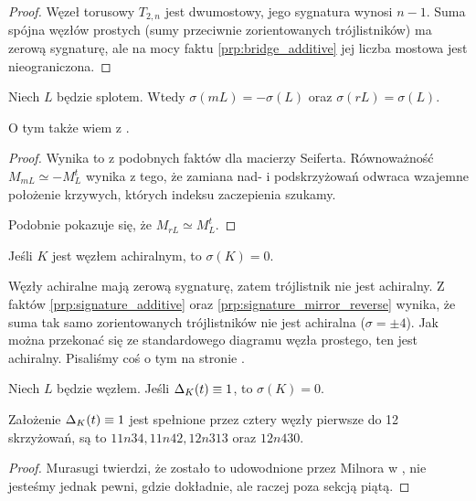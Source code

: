 \begin{proof}
    Węzeł torusowy $T_{2,n}$ jest dwumostowy, jego sygnatura wynosi $n - 1$.
    Suma spójna węzłów prostych (sumy przeciwnie zorientowanych trójlistników) ma zerową sygnaturę, ale na mocy faktu \ref{prp:bridge_additive} jej liczba mostowa jest nieograniczona.
\end{proof}

\begin{proposition}
%
%
\label{prp:signature_mirror_reverse}%
    Niech $L$ będzie splotem.
    Wtedy $\sigma(mL) = -\sigma(L)$ oraz $\sigma(rL) = \sigma(L)$.
\end{proposition}

O tym także wiem z \cite[s. 127]{murasugi96}.

\begin{proof}
    Wynika to z podobnych faktów dla macierzy Seiferta.
    Równoważność $M_{mL} \simeq - M_L^t$ wynika z tego, że zamiana nad- i podskrzyżowań odwraca wzajemne położenie krzywych, których indeksu zaczepienia szukamy.

    Podobnie pokazuje się, że $M_{rL} \simeq M_L^t$.
\end{proof}

\begin{corollary}
%
\label{cor:acheiral_signature}%
    Jeśli $K$ jest węzłem achiralnym, to $\sigma(K) = 0$.
\end{corollary}

Węzły achiralne mają zerową sygnaturę, zatem trójlistnik nie jest achiralny.
Z faktów \ref{prp:signature_additive} oraz \ref{prp:signature_mirror_reverse} wynika, że suma tak samo zorientowanych trójlistników nie jest achiralna ($\sigma = \pm 4$).
Jak można przekonać się ze standardowego diagramu węzła prostego, ten jest achiralny.
Pisaliśmy coś o tym na stronie \pageref{two_sums_of_two_trefoils}.

\begin{proposition}
%
    Niech $L$ będzie węzłem.
    Jeśli $\Delta_K(t) \equiv 1$, to $\sigma (K) = 0$.
\end{proposition}

Założenie $\Delta_K(t) \equiv 1$ jest spełnione przez cztery węzły pierwsze do 12 skrzyżowań, są to $11n34, 11n42, 12n313$ oraz $12n430$.

\begin{proof}
%
    Murasugi twierdzi, że zostało to udowodnione przez Milnora w \cite{milnor68}, nie jesteśmy jednak pewni, gdzie dokładnie, ale raczej poza sekcją piątą.
\end{proof}

